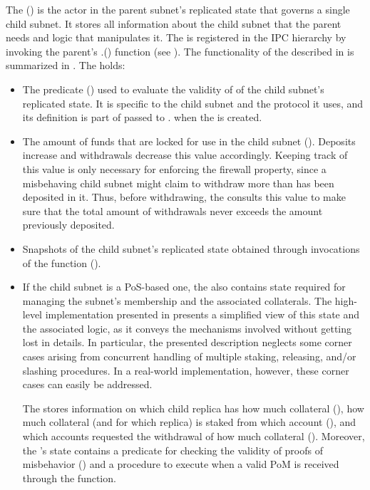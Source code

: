 The \saFull (\sa) is the actor in the parent subnet's replicated state that governs a single child subnet.
It stores all information about the child subnet that the parent needs and logic that manipulates it.
The \sa is registered in the IPC hierarchy by invoking the parent's \gw.() function (see ).
The functionality of the \sa described in  is summarized in .
The \sa holds:
\begin{itemize}
    
    \item The predicate () used to evaluate the validity of \pofsFull of the child subnet's replicated state.
    It is specific to the child subnet and the protocol it uses, and its definition is part of  passed to \gw. when the \sa is created.

    \item The amount of funds that are locked for use in the child subnet ().
    Deposits increase and withdrawals decrease this value accordingly.
    Keeping track of this value is only necessary for enforcing the firewall property, since a misbehaving child subnet might claim to withdraw more than has been deposited in it.
    Thus, before withdrawing, the \sa consults this value to make sure that the total amount of withdrawals never exceeds the amount previously deposited.

    \item Snapshots of the child subnet's replicated state obtained through invocations of the  function ().

    \item If the child subnet is a PoS-based one, the \sa also contains state required for managing the subnet's membership and the associated collaterals.
    The high-level implementation presented in  presents a simplified view of this state and the associated logic, as it conveys the mechanisms involved without getting lost in details.
    In particular, the presented description neglects some corner cases arising from concurrent handling of multiple staking, releasing, and/or slashing procedures.
    In a real-world implementation, however, these corner cases can easily be addressed.

    The \sa stores information on which child replica has how much collateral (),
    how much collateral (and for which replica) is staked from which account (),
    and which accounts requested the withdrawal of how much collateral ().
    Moreover, the \sa's state contains a predicate for checking the validity of proofs of misbehavior ()
    and a procedure to execute when a valid PoM is received through the  function.
    
\end{itemize}


